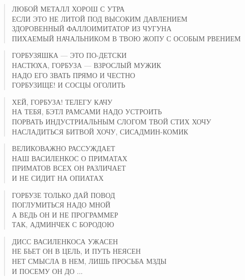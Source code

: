 \poemtitle{***}
\begin{verse}
ЛЮБОЙ МЕТАЛЛ ХОРОШ С УТРА\\
ЕСЛИ ЭТО НЕ ЛИТОЙ ПОД ВЫСОКИМ ДАВЛЕНИЕМ \\
ЗДОРОВЕННЫЙ ФАЛЛОИМИТАТОР ИЗ ЧУГУНА\\
ПИХАЕМЫЙ НАЧАЛЬНИКОМ В ТВОЮ ЖОПУ С ОСОБЫМ РВЕНИЕМ
\end{verse}

\poemtitle{***}
\begin{verse}
ГОРБУЗЯШКА — ЭТО ПО-ДЕТСКИ\\
НАСТЮХА, ГОРБУЗА — ВЗРОСЛЫЙ МУЖИК\\
НАДО ЕГО ЗВАТЬ ПРЯМО И ЧЕСТНО\\
ГОРБУЗИЩЕ! И СОСЦЫ ОГОЛИТЬ
\end{verse}

\poemtitle{***}
\begin{verse}
ХЕЙ, ГОРБУЗА! ТЕЛЕГУ КАЧУ\\
НА ТЕБЯ, БЭТЛ РАМСАМИ НАДО УСТРОИТЬ\\
ПОРВАТЬ ИНДУСТРИАЛЬНЫМ СЛОГОМ ТВОЙ СТИХ ХОЧУ\\
НАСЛАДИТЬСЯ БИТВОЙ ХОЧУ, СИСАДМИН-КОМИК
\end{verse}

\poemtitle{***}
\begin{verse}
ВЕЛИКОВАЖНО РАССУЖДАЕТ\\
НАШ ВАСИЛЕНКОС О ПРИМАТАХ\\
ПРИМАТОВ ВСЕХ ОН РАЗЛИЧАЕТ\\
И НЕ СИДИТ НА ОПИАТАХ
\end{verse}

\poemtitle{***}
\begin{verse}
ГОРБУЗЕ ТОЛЬКО ДАЙ ПОВОД\\
ПОГЛУМИТЬСЯ НАДО МНОЙ\\
А ВЕДЬ ОН И НЕ ПРОГРАММЕР\\
ТАК, АДМИНЧЕК С БОРОДОЮ
\end{verse}

\poemtitle{***}
\begin{verse}
ДИСС ВАСИЛЕНКОСА УЖАСЕН\\
НЕ БЬЕТ ОН В ЦЕЛЬ, И ПУТЬ НЕЯСЕН\\
НЕТ СМЫСЛА В НЕМ, ЛИШЬ ПРОСЬБА МЗДЫ\\
И ПОСЕМУ ОН ДО ...
\end{verse}

